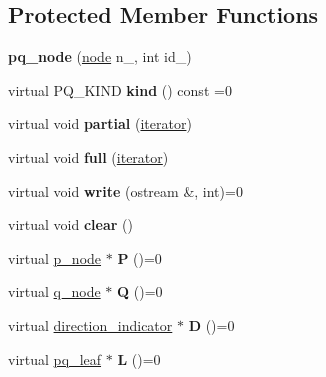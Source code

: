 \subsection*{Protected Member Functions}
\begin{DoxyCompactItemize}
\item 
\mbox{\label{classpq__node_a75720c94fd6e2865ba24c76ff66b33b2}} 
{\bfseries pq\+\_\+node} (\mbox{\hyperlink{classnode}{node}} n\+\_\+, int id\+\_\+)
\item 
\mbox{\label{classpq__node_aa9873c0cfad88bc4404857ce57d422e4}} 
virtual P\+Q\+\_\+\+K\+I\+ND {\bfseries kind} () const =0
\item 
\mbox{\label{classpq__node_aa6830ab47a280f41fe61b7d2f8b508bb}} 
virtual void {\bfseries partial} (\mbox{\hyperlink{structsymlist__iterator}{iterator}})
\item 
\mbox{\label{classpq__node_af1ba861293e4493dba7cc2c9332fee76}} 
virtual void {\bfseries full} (\mbox{\hyperlink{structsymlist__iterator}{iterator}})
\item 
\mbox{\label{classpq__node_a66e00b01a0f49da14090dd8537b96816}} 
virtual void {\bfseries write} (ostream \&, int)=0
\item 
\mbox{\label{classpq__node_a13100e0b030cc047f382d9ddf6a44f4a}} 
virtual void {\bfseries clear} ()
\item 
\mbox{\label{classpq__node_a72178a268ee1ece3ac106ac5fea3b12c}} 
virtual \mbox{\hyperlink{classp__node}{p\+\_\+node}} $\ast$ {\bfseries P} ()=0
\item 
\mbox{\label{classpq__node_aeeefcfcd19dbe4ca94e190006e8dd484}} 
virtual \mbox{\hyperlink{classq__node}{q\+\_\+node}} $\ast$ {\bfseries Q} ()=0
\item 
\mbox{\label{classpq__node_a5c85bd25c32bb6f18d6d8d1bfd35f260}} 
virtual \mbox{\hyperlink{classdirection__indicator}{direction\+\_\+indicator}} $\ast$ {\bfseries D} ()=0
\item 
\mbox{\label{classpq__node_a805b6ef48c847380b47c8ba882ed4ee2}} 
virtual \mbox{\hyperlink{classpq__leaf}{pq\+\_\+leaf}} $\ast$ {\bfseries L} ()=0
\end{DoxyCompactItemize}

